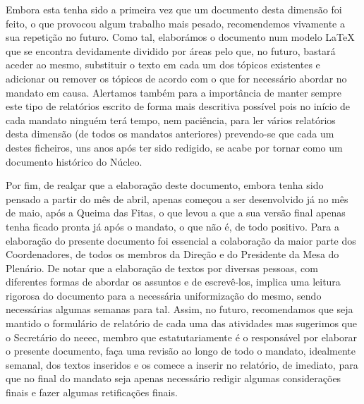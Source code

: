 Embora esta tenha sido a primeira vez que um documento desta dimensão foi feito, o que provocou algum trabalho mais pesado, recomendemos vivamente a sua repetição no futuro. Como tal, elaborámos o documento num modelo LaTeX que se encontra devidamente dividido por áreas pelo que, no futuro, bastará aceder ao mesmo, substituir o texto em cada um dos tópicos existentes e adicionar ou remover os tópicos de acordo com o que for necessário abordar no mandato em causa. Alertamos também para a importância de manter sempre este tipo de relatórios escrito de forma mais descritiva possível pois no início de cada mandato ninguém terá tempo, nem paciência, para ler vários relatórios desta dimensão (de todos os mandatos anteriores) prevendo-se que cada um destes ficheiros, uns anos após ter sido redigido, se acabe por tornar como um documento histórico do Núcleo.

Por fim, de realçar que a elaboração deste documento, embora tenha sido pensado a partir do mês de abril, apenas começou a ser desenvolvido já no mês de maio, após a Queima das Fitas, o que levou a que a sua versão final apenas tenha ficado pronta já após o mandato, o que não é, de todo positivo. Para a elaboração do presente documento foi essencial a colaboração da maior parte dos Coordenadores, de todos os membros da Direção e do Presidente da Mesa do Plenário. De notar que a elaboração de textos por diversas pessoas, com diferentes formas de abordar os assuntos e de escrevê-los, implica uma leitura rigorosa do documento para a necessária uniformização do mesmo, sendo necessárias algumas semanas para tal. Assim, no futuro, recomendamos que seja mantido o formulário de relatório de cada uma das atividades mas sugerimos que o Secretário do \acrshort{neeec}, membro que estatutariamente é o responsável por elaborar o presente documento, faça uma revisão ao longo de todo o mandato, idealmente semanal, dos textos inseridos e os comece a inserir no relatório, de imediato, para que no final do mandato seja apenas necessário redigir algumas considerações finais e fazer algumas retificações finais.